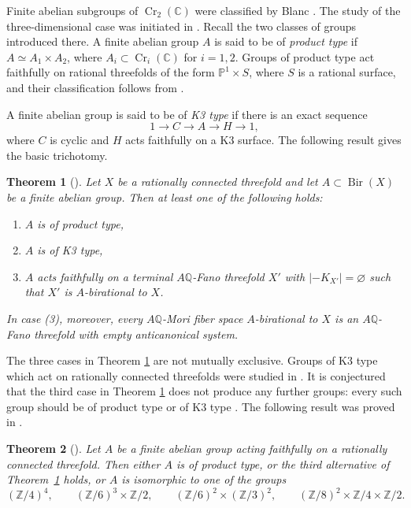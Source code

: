 \documentclass[10pt,oneside,reqno]{amsart}
\numberwithin{equation}{section}
\newtheorem{theorem}{Theorem}[section]
\theoremstyle{definition}
\newcommand{\Z}{\mathbb Z}
\newcommand{\Q}{\mathbb Q}
\newcommand{\C}{\mathbb C}
\newcommand{\Cr}{\operatorname{Cr}}
\begin{document}
Finite abelian subgroups of $\Cr_2(\C)$ were classified by Blanc
\cite{Blanc}.  The study of the three-dimensional case was initiated in
\cite{LoginovProduct}.  Recall the two classes of groups introduced
there.  A finite abelian group $A$ is said to be of \emph{product type}
if $A\simeq A_1\times A_2$, where $A_i\subset\Cr_i(\C)$ for $i=1,2$. Groups of product type act faithfully on rational threefolds of the
form $\mathbb{P}^1\times S$, where $S$ is a rational surface, and their
classification follows from \cite{Blanc}.

A finite abelian group is said to be of \emph{K3 type} if there is an exact sequence
\[
 1\longrightarrow C\longrightarrow A\longrightarrow H
 \longrightarrow1,
\]
where $C$ is cyclic and $H$ acts faithfully on a K3 surface.  
The following result gives the basic trichotomy.

\begin{theorem}[{\cite[Theorem 1.7]{LoginovProduct}}]
\label{thm-three-types}
Let $X$ be a rationally connected threefold and let
$A\subset\operatorname{Bir}(X)$ be a finite abelian group.  Then at
least one of the following holds:
\begin{enumerate}
\item $A$ is of product type,
\item $A$ is of K3 type,
\item $A$ acts faithfully on a terminal $A\Q$-Fano threefold $X'$ with
$|-K_{X'}|=\varnothing$ such that $X'$ is $A$-birational to $X$.
\end{enumerate}
In case {\rm(3)}, moreover, every $A\Q$-Mori fiber space
$A$-birational to $X$ is an $A\Q$-Fano threefold with empty
anticanonical system.
\end{theorem}

The three cases in Theorem \ref{thm-three-types} are not mutually exclusive.  
Groups
of K3 type which act on rationally connected threefolds were studied in \cite{LPZ}. 
It is conjectured
that the third case in Theorem \ref{thm-three-types} does not produce any further groups: every such
group should be of product type or of K3 type
\cite[Conjecture 1.8]{LoginovProduct}.  
The following result was proved in \cite{LPZ}.

\begin{theorem}[{\cite[Theorem 1.5]{LPZ}}]
\label{thm-intro-2}
Let $A$ be a finite abelian group acting faithfully on a rationally
connected threefold.  Then either $A$ is of product type, or the third
alternative of Theorem~\ref{thm-three-types} holds, or $A$ is
isomorphic to one of the groups
\begin{equation}
\label{eq-exceptional-groups}
 (\Z/4)^4,\qquad
 (\Z/6)^3\times\Z/2,\qquad
 (\Z/6)^2\times(\Z/3)^2,\qquad
 (\Z/8)^2\times\Z/4\times\Z/2.
\end{equation}
\end{theorem}
\end{document}
